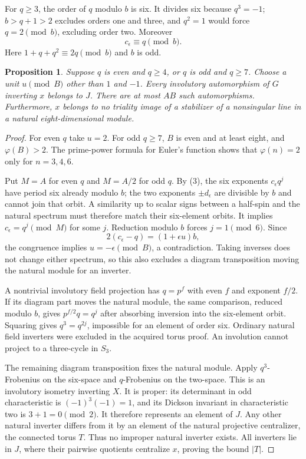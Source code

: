 \documentclass[11pt,a4paper]{article}
\newtheorem{proposition}[lemma]{Proposition}
\begin{document}
For $q\ge3$, the order of $q$ modulo $b$ is six.
It divides six because $q^3=-1$; $b>q+1>2$ excludes orders one
and three, and $q^2=1$ would force $q=2\pmod b$, excluding order two.
Moreover
\[
                              c_\epsilon\equiv q\pmod b.     \tag{3}
\]
Here $1+q+q^2\equiv2q\pmod b$ and $b$ is odd.

\begin{proposition}\label{generic}
Suppose $q$ is even and $q\ge4$, or $q$ is odd and $q\ge7$.
Choose a unit $u\pmod B$ other than $1$ and $-1$.
Every involutory automorphism of $G$ inverting $x$ belongs to $J$.
There are at most $AB$ such automorphisms.
Furthermore, $x$ belongs to no triality image of a stabilizer of a
nonsingular line in a natural eight-dimensional module.
\end{proposition}
\begin{proof}
For even $q$ take $u=2$. For odd $q\ge7$, $B$ is even and at least
eight, and $\varphi(B)>2$. The prime-power formula for Euler's function
shows that $\varphi(n)=2$ only for $n=3,4,6$.

Put $M=A$ for even $q$ and $M=A/2$ for odd $q$. By (3), the six
exponents $c_\epsilon q^j$ have period six already modulo $b$;
the two exponents $\pm d_\epsilon$ are divisible by $b$ and cannot
join that orbit. A similarity up to scalar signs between a half-spin
and the natural spectrum must therefore match their six-element orbits.
It implies $c_\epsilon=q^j\pmod M$ for some $j$. Reduction modulo $b$
forces $j=1\pmod6$. Since
\[
                       2(c_\epsilon-q)=(1+\epsilon u)b,
\]
the congruence implies $u=-\epsilon\pmod B$, a contradiction.
Taking inverses does not change either spectrum, so this also excludes
a diagram transposition moving the natural module for an inverter.

A nontrivial involutory field projection has $q=p^f$ with even $f$
and exponent $f/2$. If its diagram part moves the natural module,
the same comparison, reduced modulo $b$, gives
$p^{f/2}q=q^j$ after absorbing inversion into the six-element orbit.
Squaring gives $q^3=q^{2j}$, impossible for an element of order six.
Ordinary natural field inverters were excluded in the acquired torus
proof. An involution cannot project to a three-cycle in $S_3$.

The remaining diagram transposition fixes the natural module.
Apply $q^3$-Frobenius on the six-space and $q$-Frobenius on the
two-space. This is an involutory isometry inverting $X$.
It is proper: its determinant in odd characteristic is
$(-1)^3(-1)=1$, and its Dickson invariant in characteristic two is
$3+1=0\pmod2$. It therefore represents an element of $J$.
Any other natural inverter differs from it by an element of the
natural projective centralizer, the connected torus $T$.
Thus no improper natural inverter exists. All inverters lie in $J$,
where their pairwise quotients centralize $x$, proving the bound $|T|$.


\end{proof}
\end{document}
